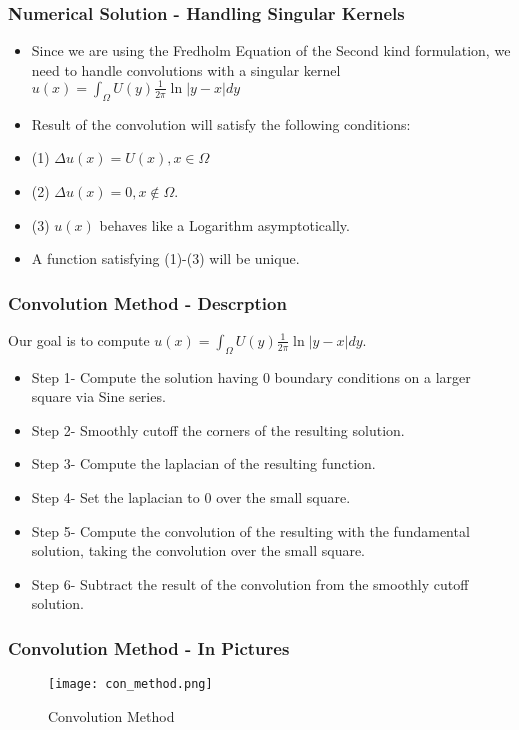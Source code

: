 \documentclass[]{beamer}
\begin{document}
\begin{frame}
    \frametitle{Numerical Solution - Handling Singular Kernels}
  \begin{itemize}
      \item Since we are using the Fredholm Equation of the Second kind formulation, we need to handle convolutions with a singular kernel $u(x) = \int_{\Omega}U(y)\frac{1}{2\pi}\ln|y-x|dy$
        \item Result of the convolution will satisfy the following conditions:
        \item (1) $\Delta u(x) = U(x), x \in \Omega$
        \item (2) $\Delta u(x) = 0, x \notin \Omega$.
        \item (3) $u(x)$ behaves like a Logarithm asymptotically.
        \item A function satisfying (1)-(3) will be unique.
  \end{itemize}
\end{frame}

\begin{frame}
    \frametitle{Convolution Method - Descrption}
     Our goal is to compute $u(x) = \int_{\Omega}U(y)\frac{1}{2\pi}\ln|y-x|dy$.
     \begin{itemize}
        \item Step 1- Compute the solution having $0$ boundary conditions on a larger square via Sine series.
        \item Step 2- Smoothly cutoff the corners of the resulting solution.
        \item Step 3- Compute the laplacian of the resulting function.
        \item Step 4- Set the laplacian to $0$ over the small square.
        \item Step 5- Compute the convolution of the resulting with the fundamental solution, taking the convolution over the small square. 
        \item Step 6- Subtract the result of the convolution from the smoothly cutoff solution.
    \end{itemize}
  \end{frame}


\begin{frame}
    \frametitle{Convolution Method - In Pictures}
     \begin{figure}
   \texttt{[image: con\_method.png]}
    \caption{Convolution Method}
  \end{figure}
\end{frame}
\end{document}
